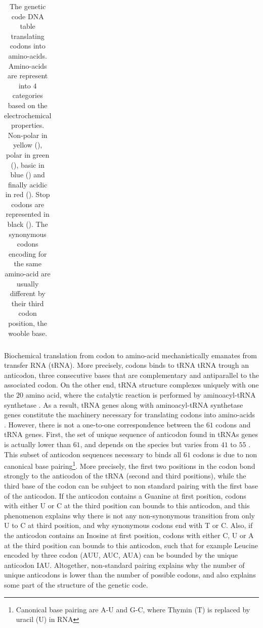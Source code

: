 \begin{table}[H]
{\begin{tabular}{|c||l|c|l|c|l|c|l|c||c|}
			\hline
	\end{tabular}}
	\caption[The Genetic Code]{
		The genetic code DNA table translating codons into amino-acids.
		Amino-acids are represent into $4$ categories based on the electrochemical properties.
		Non-polar in yellow (\textcolor{Nonpolar}{}), polar in green (\textcolor{Polar}{}), basic in blue (\textcolor{Basic}{}) and finally acidic in red (\textcolor{Acidic}{}).
		Stop codons are represented in black (\textcolor{Stop}{}).
		The synonymous codons encoding for the same amino-acid are usually different by their third codon position, the wooble base.
	}
	\label{table:genetic_code}
\end{table}

Biochemical translation from \gls{codon} to amino-acid mechanistically emanates from transfer \acrshort{RNA} (\acrshort{tRNA}).
More precisely, codons binds to \acrshort{tRNA} \acrshort{tRNA} trough an anticodon, three consecutive bases that are complementary and antiparallel to the associated \gls{codon}.
On the other end, \acrshort{tRNA} structure complexes uniquely with one the $20$ amino acid, where the catalytic reaction is performed by aminoacyl-tRNA synthetase \citep{Rich1976}.
As a result, \acrshort{tRNA} genes along with aminoacyl-tRNA synthetase genes constitute the machinery necessary for translating codons into amino-acids .
However, there is not a one-to-one correspondence between the $61$ codons and \acrshort{tRNA} genes.
First, the set of unique sequence of anticodon found in tRNAs genes is actually lower than $61$, and depends on the species but varies from $41$ to $55$ \citep{Goodenbour2006}.
This subset of anticodon sequences necessary to binds all $61$ codons is due to non canonical base pairing\footnote{Canonical base pairing are A-U and G-C, where Thymin (T) is replaced by uracil (U) in RNA}.
More precisely, the first two positions in the codon bond strongly to the anticodon of the tRNA (second and third positions), while the third base of the codon can be subject to non standard pairing with the first base of the anticodon.
If the anticodon contains a Guanine at first position, codons with either U or C at the third position can bounds to this anticodon, and this phenomenon explains why there is not any non-synonymous transition from only U to C at third position, and why synonymous codons end with T or C.
Also, if the anticodon contains an Inosine at first position, codons with either C, U or A at the third position can bounds to this anticodon, such that for example Leucine encoded by three codon (AUU, AUC, AUA) can be bounded by the unique anticodon IAU.
Altogether, non-standard pairing explains why the number of unique anticodons is lower than the number of possible codons, and also explains some part of the structure of the genetic code.

